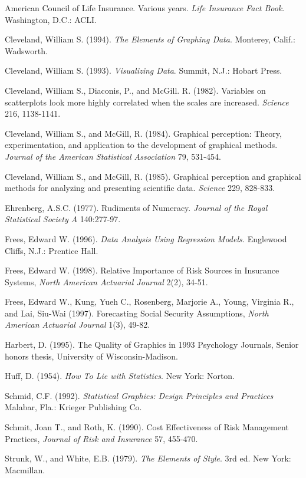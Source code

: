 \begin{multicols}{2}


American Council of Life Insurance. Various years. \emph{Life
Insurance Fact Book}. Washington, D.C.: ACLI.

Cleveland, William S. (1994). \emph{The Elements of Graphing Data}.
Monterey, Calif.: Wadsworth.

Cleveland, William S. (1993).  \emph{Visualizing Data}. Summit,
N.J.: Hobart Press.

Cleveland, William S., Diaconis, P., and McGill. R. (1982).
Variables on scatterplots look more highly correlated when the
scales are increased. \emph{Science} 216, 1138-1141.

Cleveland, William S., and McGill, R. (1984). Graphical perception:
Theory, experimentation, and application to the development of
graphical methods. \emph{Journal of the American Statistical
Association} 79, 531-454.

Cleveland, William S., and McGill, R. (1985). Graphical perception
and graphical methods for analyzing and presenting scientific data.
\emph{Science} 229, 828-833.

Ehrenberg, A.S.C. (1977). Rudiments of Numeracy. \emph{Journal of
the Royal Statistical Society A} 140:277-97.

Frees, Edward W. (1996). \emph{Data Analysis Using Regression
Models.} Englewood Cliffs, N.J.: Prentice Hall.

Frees, Edward W. (1998). Relative Importance of Risk Sources in
Insurance Systems, \emph{North American Actuarial Journal} 2(2),
34-51.

Frees, Edward W., Kung, Yueh C., Rosenberg, Marjorie A., Young,
Virginia R., and Lai, Siu-Wai (1997). Forecasting Social Security
Assumptions, \emph{North American Actuarial Journal} 1(3), 49-82.

Harbert, D. (1995). The Quality of Graphics in 1993 Psychology
Journals, Senior honors thesis, University of Wisconsin-Madison.

Huff, D. (1954). \emph{How To Lie with Statistics}. New York:
Norton.

Schmid, C.F. (1992). \emph{Statistical Graphics: Design Principles
and Practices} Malabar, Fla.: Krieger Publishing Co.

Schmit, Joan T., and Roth, K. (1990). Cost Effectiveness of Risk
Management Practices, \emph{Journal of Risk and Insurance} 57,
455-470.

Strunk, W., and White, E.B. (1979). \emph{The Elements of Style}.
3rd ed. New York: Macmillan.


\end{multicols}
